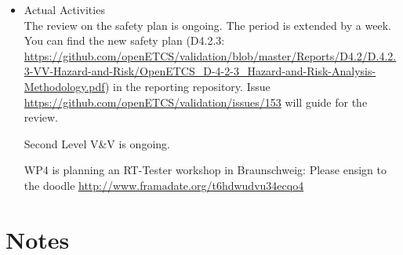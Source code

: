\documentclass[a4paper, 11pt]{article}
\begin{document}
\begin{itemize}
\item Actual Activities\\
The review on the safety plan is ongoing. The period is extended by a week. You can find the new safety plan (D4.2.3: \url{https://github.com/openETCS/validation/blob/master/Reports/D4.2/D.4.2.3-VV-Hazard-and-Risk/OpenETCS_D-4-2-3_Hazard-and-Risk-Analysis-Methodology.pdf}) in the reporting repository. Issue \url{https://github.com/openETCS/validation/issues/153} will guide for the review. 

Second Level V\&V is ongoing.

WP4 is planning an RT-Tester workshop in Braunschweig: Please ensign to the doodle \url{http://www.framadate.org/t6hdwudvu34ecqo4}

\end{itemize}

\section{Notes}
\end{document}
